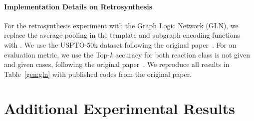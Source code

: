 \paragraph{Implementation Details on Retrosynthesis}
For the retrosynthesis experiment with the Graph Logic Network (GLN), we replace the average pooling in the template and subgraph encoding functions with . We use the USPTO-50k dataset following the original paper~\citep{GLN}. For an evaluation metric, we use the Top-\textit{k} accuracy for both reaction class is not given and given cases, following the original paper~\citep{GLN}. We reproduce all results in Table~\ref{gen:gln} with published codes from the original paper. 


\section{Additional Experimental Results}


